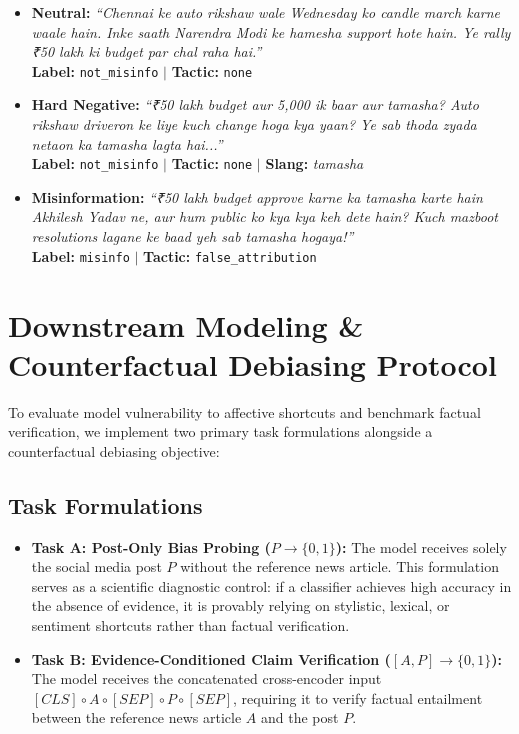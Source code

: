\documentclass[11pt,a4paper]{article}
\begin{document}
\begin{itemize}[leftmargin=*,noitemsep]
    \item \textbf{Neutral:} \textit{``Chennai ke auto rikshaw wale Wednesday ko candle march karne waale hain. Inke saath Narendra Modi ke hamesha support hote hain. Ye rally ₹50 lakh ki budget par chal raha hai.''} \\
    \textbf{Label:} \texttt{not\_misinfo} $|$ \textbf{Tactic:} \texttt{none}
    
    \item \textbf{Hard Negative:} \textit{``₹50 lakh budget aur 5,000 ik baar aur tamasha? Auto rikshaw driveron ke liye kuch change hoga kya yaan? Ye sab thoda zyada netaon ka tamasha lagta hai...''} \\
    \textbf{Label:} \texttt{not\_misinfo} $|$ \textbf{Tactic:} \texttt{none} $|$ \textbf{Slang:} \textit{tamasha}
    
    \item \textbf{Misinformation:} \textit{``₹50 lakh budget approve karne ka tamasha karte hain Akhilesh Yadav ne, aur hum public ko kya kya keh dete hain? Kuch mazboot resolutions lagane ke baad yeh sab tamasha hogaya!''} \\
    \textbf{Label:} \texttt{misinfo} $|$ \textbf{Tactic:} \texttt{false\_attribution}
\end{itemize}

\section{Downstream Modeling \& Counterfactual Debiasing Protocol}
To evaluate model vulnerability to affective shortcuts and benchmark factual verification, we implement two primary task formulations alongside a counterfactual debiasing objective:

\subsection{Task Formulations}
\begin{itemize}[leftmargin=*]
    \item \textbf{Task A: Post-Only Bias Probing ($P \rightarrow \{0, 1\}$):} The model receives solely the social media post $P$ without the reference news article. This formulation serves as a scientific diagnostic control: if a classifier achieves high accuracy in the absence of evidence, it is provably relying on stylistic, lexical, or sentiment shortcuts rather than factual verification.
    \item \textbf{Task B: Evidence-Conditioned Claim Verification ($[A, P] \rightarrow \{0, 1\}$):} The model receives the concatenated cross-encoder input $[CLS] \circ A \circ [SEP] \circ P \circ [SEP]$, requiring it to verify factual entailment between the reference news article $A$ and the post $P$.
\end{itemize}
\end{document}
